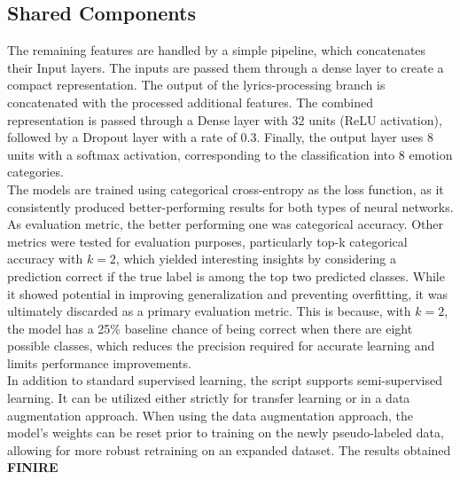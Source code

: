 \subsection*{Shared Components}
The remaining features are handled by a simple pipeline, which concatenates
their Input layers.
The inputs are passed them through a dense layer to create a compact
representation.
The output of the lyrics-processing branch is concatenated with the processed
additional features.
The combined representation is passed through a Dense layer with 32 units
(ReLU activation), followed by a Dropout layer with a rate of 0.3.
Finally, the output layer uses 8 units with a softmax activation, corresponding
to the classification into 8 emotion categories.\\


The models are trained using categorical cross-entropy as the loss function,
as it consistently produced better-performing results for both types of
neural networks.
As evaluation metric, the better performing one was categorical accuracy.
Other metrics were tested for evaluation purposes, particularly
top-k categorical accuracy with $k=2$, which yielded interesting insights
by considering a prediction correct if the true label is among the top two
predicted classes. While it showed potential in improving generalization and
preventing overfitting, it was ultimately discarded as a primary evaluation
metric. This is because, with $k=2$, the model has a 25\% baseline
chance of being correct when there are eight possible classes, which reduces
the precision required for accurate learning and limits performance improvements.\\

In addition to standard supervised learning, the script supports semi-supervised
learning. It can be utilized either strictly for transfer learning or in a data
augmentation approach. When using the data augmentation approach, the model's
weights can be reset prior to training on the newly pseudo-labeled data, allowing
for more robust retraining on an expanded dataset.
The results obtained \textbf{FINIRE}